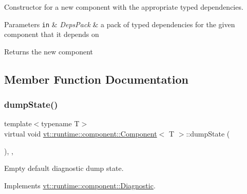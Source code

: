 Constructor for a new component with the appropriate typed dependencies. 


\begin{DoxyParams}[1]{Parameters}
\mbox{\tt in}  & {\em Deps\+Pack} & a pack of typed dependencies for the given component that it depends on\\
\hline
\end{DoxyParams}
\begin{DoxyReturn}{Returns}
the new component 
\end{DoxyReturn}


\subsection{Member Function Documentation}
\mbox{\label{structvt_1_1runtime_1_1component_1_1_component_adaf8bd995d4c91702e2ff7806ad9e695}} 
\subsubsection{\texorpdfstring{dump\+State()}{dumpState()}}
{\footnotesize\ttfamily template$<$typename T$>$ \\
virtual void \hyperlink{structvt_1_1runtime_1_1component_1_1_component}{vt\+::runtime\+::component\+::\+Component}$<$ T $>$\+::dump\+State (\begin{DoxyParamCaption}{ }\end{DoxyParamCaption})\hspace{0.3cm}{\ttfamily [inline]}, {\ttfamily [override]}, {\ttfamily [virtual]}}



Empty default diagnostic dump state. 



Implements \hyperlink{structvt_1_1runtime_1_1component_1_1_diagnostic_a1b6da987a14917c7ee8a4d00138e62e6}{vt\+::runtime\+::component\+::\+Diagnostic}.

\mbox{\label{structvt_1_1runtime_1_1component_1_1_component_a098e362de01af6054e5491fba671a959}} 
